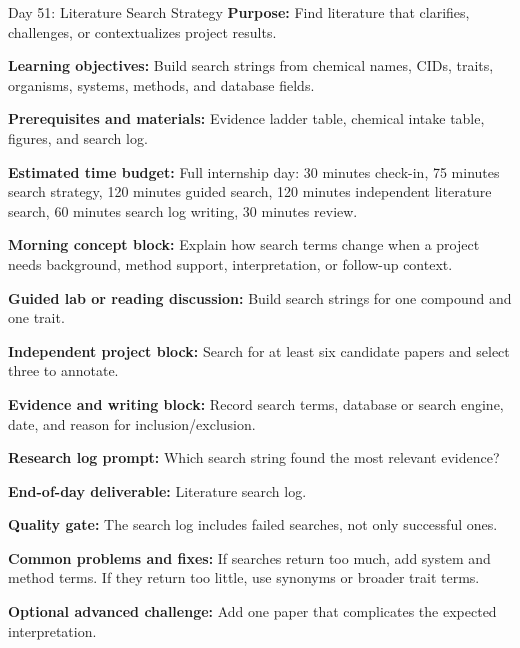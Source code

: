 \begin{dailybox}{Day 51: Literature Search Strategy}
\textbf{Purpose:} Find literature that clarifies, challenges, or contextualizes project results.

\textbf{Learning objectives:} Build search strings from chemical names, CIDs, traits, organisms, systems, methods, and database fields.

\textbf{Prerequisites and materials:} Evidence ladder table, chemical intake table, figures, and search log.

\textbf{Estimated time budget:} Full internship day: 30 minutes check-in, 75 minutes search strategy, 120 minutes guided search, 120 minutes independent literature search, 60 minutes search log writing, 30 minutes review.

\textbf{Morning concept block:} Explain how search terms change when a project needs background, method support, interpretation, or follow-up context.

\textbf{Guided lab or reading discussion:} Build search strings for one compound and one trait.

\textbf{Independent project block:} Search for at least six candidate papers and select three to annotate.

\textbf{Evidence and writing block:} Record search terms, database or search engine, date, and reason for inclusion/exclusion.

\textbf{Research log prompt:} Which search string found the most relevant evidence?

\textbf{End-of-day deliverable:} Literature search log.

\textbf{Quality gate:} The search log includes failed searches, not only successful ones.

\textbf{Common problems and fixes:} If searches return too much, add system and method terms. If they return too little, use synonyms or broader trait terms.

\textbf{Optional advanced challenge:} Add one paper that complicates the expected interpretation.
\end{dailybox}

